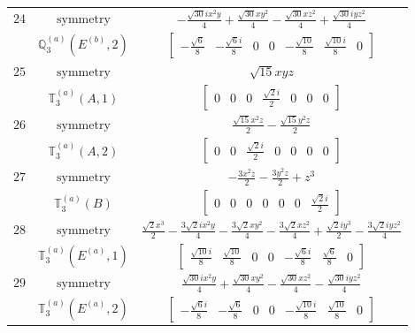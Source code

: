 \documentclass[fleqn,8pt,landscape]{jsarticle}
\begin{document}
\begin{longtable}{ccc}
$ 24 $ & $ \text{symmetry} $ & $ - \frac{\sqrt{30} i x^{2} y}{4} + \frac{\sqrt{30} x y^{2}}{4} - \frac{\sqrt{30} x z^{2}}{4} + \frac{\sqrt{30} i y z^{2}}{4} $ \\
$  $ & $ \mathbb{Q}_{3}^{(a)}(E^{(b)},2) $ & $ \begin{bmatrix} - \frac{\sqrt{6}}{8} & - \frac{\sqrt{6} i}{8} & 0 & 0 & - \frac{\sqrt{10}}{8} & \frac{\sqrt{10} i}{8} & 0 \end{bmatrix} $ \\ \hline
$ 25 $ & $ \text{symmetry} $ & $ \sqrt{15} x y z $ \\
$  $ & $ \mathbb{T}_{3}^{(a)}(A,1) $ & $ \begin{bmatrix} 0 & 0 & 0 & \frac{\sqrt{2} i}{2} & 0 & 0 & 0 \end{bmatrix} $ \\ \hline
$ 26 $ & $ \text{symmetry} $ & $ \frac{\sqrt{15} x^{2} z}{2} - \frac{\sqrt{15} y^{2} z}{2} $ \\
$  $ & $ \mathbb{T}_{3}^{(a)}(A,2) $ & $ \begin{bmatrix} 0 & 0 & \frac{\sqrt{2} i}{2} & 0 & 0 & 0 & 0 \end{bmatrix} $ \\ \hline
$ 27 $ & $ \text{symmetry} $ & $ - \frac{3 x^{2} z}{2} - \frac{3 y^{2} z}{2} + z^{3} $ \\
$  $ & $ \mathbb{T}_{3}^{(a)}(B) $ & $ \begin{bmatrix} 0 & 0 & 0 & 0 & 0 & 0 & \frac{\sqrt{2} i}{2} \end{bmatrix} $ \\ \hline
$ 28 $ & $ \text{symmetry} $ & $ \frac{\sqrt{2} x^{3}}{2} - \frac{3 \sqrt{2} i x^{2} y}{4} - \frac{3 \sqrt{2} x y^{2}}{4} - \frac{3 \sqrt{2} x z^{2}}{4} + \frac{\sqrt{2} i y^{3}}{2} - \frac{3 \sqrt{2} i y z^{2}}{4} $ \\
$  $ & $ \mathbb{T}_{3}^{(a)}(E^{(a)},1) $ & $ \begin{bmatrix} \frac{\sqrt{10} i}{8} & \frac{\sqrt{10}}{8} & 0 & 0 & - \frac{\sqrt{6} i}{8} & \frac{\sqrt{6}}{8} & 0 \end{bmatrix} $ \\ \hline
$ 29 $ & $ \text{symmetry} $ & $ \frac{\sqrt{30} i x^{2} y}{4} + \frac{\sqrt{30} x y^{2}}{4} - \frac{\sqrt{30} x z^{2}}{4} - \frac{\sqrt{30} i y z^{2}}{4} $ \\
$  $ & $ \mathbb{T}_{3}^{(a)}(E^{(a)},2) $ & $ \begin{bmatrix} - \frac{\sqrt{6} i}{8} & - \frac{\sqrt{6}}{8} & 0 & 0 & - \frac{\sqrt{10} i}{8} & \frac{\sqrt{10}}{8} & 0 \end{bmatrix} $ \\ \hline

\end{longtable}
\end{document}
